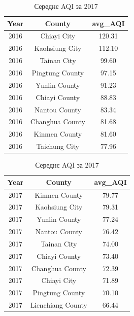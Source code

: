 \documentclass{article}
\begin{document}
\begin{enumerate}
    \begin{table}
        \centering
        \begin{minipage}{0.45\textwidth}
            \centering
            \begin{tabular}{ccc}
                \textbf{Year} & \textbf{County} & \textbf{avg\_AQI} \\
                \toprule
                2016 & Chiayi City & 120.31 \\
                2016 & Kaohsiung City & 112.10 \\
                2016 & Tainan City & 99.60 \\
                2016 & Pingtung County & 97.15 \\
                2016 & Yunlin County & 91.23 \\
                2016 & Chiayi County & 88.83 \\
                2016 & Nantou County & 83.34 \\
                2016 & Changhua County & 81.68 \\
                2016 & Kinmen County & 81.60 \\
                2016 & Taichung City & 77.96 \\
                \midrule
            \end{tabular}
            \caption{Середнє AQI за 2016}
        \end{minipage}
        \hspace{0.05\textwidth} %
        \begin{minipage}{0.45\textwidth}
            \centering
            \begin{tabular}{ccc}
                \textbf{Year} & \textbf{County} & \textbf{avg\_AQI} \\
                \toprule
                2017 & Kinmen County & 79.77 \\
                2017 & Kaohsiung City & 79.31 \\
                2017 & Yunlin County & 77.24 \\
                2017 & Nantou County & 76.42 \\
                2017 & Tainan City & 74.00 \\
                2017 & Chiayi County & 73.40 \\
                2017 & Changhua County & 72.39 \\
                2017 & Chiayi City & 71.89 \\
                2017 & Pingtung County & 70.10 \\
                2017 & Lienchiang County & 66.44 \\
                \midrule
            \end{tabular}
            \caption{Середнє AQI за 2017}
        \end{minipage}
    \end{table}
    

\end{enumerate}
\end{document}
